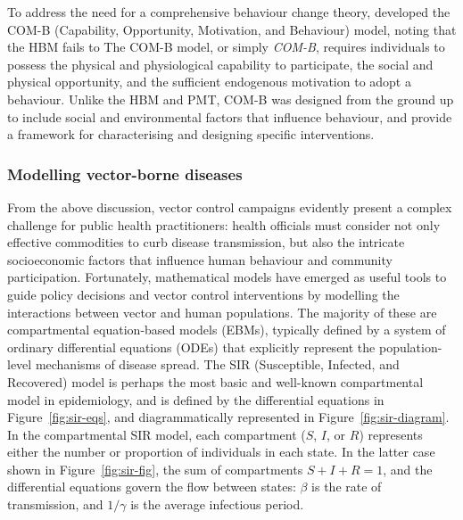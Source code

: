 To address the need for a comprehensive behaviour change theory, \citet{michie_behaviour_2011} developed the COM-B (Capability, Opportunity, Motivation, and Behaviour) model, noting that the HBM fails to  The COM-B model, or simply \textit{COM-B}, requires individuals to possess the physical and physiological capability to participate, the social and physical opportunity, and the sufficient endogenous motivation to adopt a behaviour. Unlike the HBM and PMT, COM-B was designed from the ground up to include social and environmental factors that influence behaviour, and provide a framework for characterising and designing specific interventions.


\subsubsection{Modelling vector-borne diseases}\label{sec:model-vbds}

From the above discussion, vector control campaigns evidently present a complex challenge for public health practitioners: health officials must consider not only effective commodities to curb disease transmission, but also the intricate socioeconomic factors that influence human behaviour and community participation. Fortunately, mathematical models have emerged as useful tools to guide policy decisions and vector control interventions by modelling the interactions between vector and human populations. The majority of these are compartmental equation-based models (EBMs), typically defined by a system of ordinary differential equations (ODEs) that explicitly represent the population-level mechanisms of disease spread. The SIR (Susceptible, Infected, and Recovered) model is perhaps the most basic and well-known compartmental model in epidemiology, and is defined by the differential equations in Figure~\ref{fig:sir-eqs}, and diagrammatically represented in Figure~\ref{fig:sir-diagram}. In the compartmental SIR model, each compartment ($S$, $I$, or $R$) represents either the number or proportion of individuals in each state. In the latter case shown in Figure~\ref{fig:sir-fig}, the sum of compartments $S+I+R=1$, and the differential equations govern the flow between states: $\beta$ is the rate of transmission, and $1/\gamma$ is the average infectious period.



